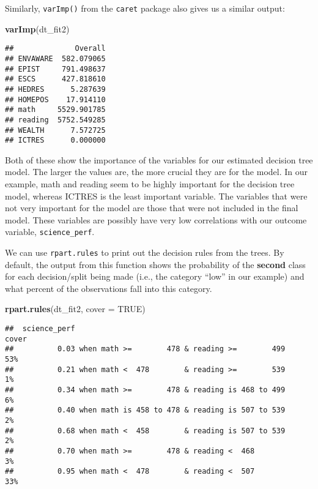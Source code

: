 \documentclass[]{book}
\newenvironment{Shaded}{\begin{snugshade}}{\end{snugshade}}
\newcommand{\DataTypeTok}[1]{\textcolor[rgb]{0.13,0.29,0.53}{#1}}
\newcommand{\KeywordTok}[1]{\textcolor[rgb]{0.13,0.29,0.53}{\textbf{#1}}}
\newcommand{\NormalTok}[1]{#1}
\newcommand{\OtherTok}[1]{\textcolor[rgb]{0.56,0.35,0.01}{#1}}
\begin{document}
Similarly, \texttt{varImp()} from the \texttt{caret} package also gives us a similar output:

\begin{Shaded}
\begin{Highlighting}[]
\KeywordTok{varImp}\NormalTok{(dt_fit2)}
\end{Highlighting}
\end{Shaded}

\begin{verbatim}
##              Overall
## ENVAWARE  582.079065
## EPIST     791.498637
## ESCS      427.818610
## HEDRES      5.287639
## HOMEPOS    17.914110
## math     5529.901785
## reading  5752.549285
## WEALTH      7.572725
## ICTRES      0.000000
\end{verbatim}

Both of these show the importance of the variables for our estimated decision tree model. The larger the values are, the more crucial they are for the model. In our example, math and reading seem to be highly important for the decision tree model, whereas ICTRES is the least important variable. The variables that were not very important for the model are those that were not included in the final model. These variables are possibly have very low correlations with our outcome variable, \texttt{science\_perf}.

We can use \texttt{rpart.rules} to print out the decision rules from the trees. By default, the output from this function shows the probability of the \textbf{second} class for each decision/split being made (i.e., the category ``low'' in our example) and what percent of the observations fall into this category.

\begin{Shaded}
\begin{Highlighting}[]
\KeywordTok{rpart.rules}\NormalTok{(dt_fit2, }\DataTypeTok{cover =} \OtherTok{TRUE}\NormalTok{)}
\end{Highlighting}
\end{Shaded}

\begin{verbatim}
##  science_perf                                                   cover
##          0.03 when math >=        478 & reading >=        499     53%
##          0.21 when math <  478        & reading >=        539      1%
##          0.34 when math >=        478 & reading is 468 to 499      6%
##          0.40 when math is 458 to 478 & reading is 507 to 539      2%
##          0.68 when math <  458        & reading is 507 to 539      2%
##          0.70 when math >=        478 & reading <  468             3%
##          0.95 when math <  478        & reading <  507            33%
\end{verbatim}
\end{document}

